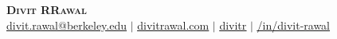 \begin{center}
    \textbf{\Huge \scshape Divit RRawal} \\
    \vspace{1pt}
    \faEnvelope{} \href{mailto:divit.rawal@berkeley.edu}{\underline{divit.rawal@berkeley.edu}} $|$ 
    \faGlobe{} \href{https://www.divitrawal.com}{\underline{divitrawal.com}} $|$
    \faGithub{} \href{https://www.github.com/divitr}{\underline{divitr}} $|$
    \faLinkedin{} \href{https://www.linkedin.com/in/divit-rawal}{\underline{/in/divit-rawal}}
\end{center}
